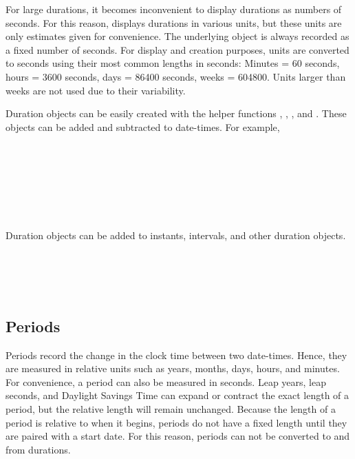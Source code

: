 \documentclass[article]{jss}
\begin{document}
For large durations, it becomes inconvenient to display durations as numbers of seconds. For this reason,  displays durations in various units, but these units are only estimates given for convenience. The underlying object is always recorded as a fixed number of seconds. For display and creation purposes, units are converted to seconds using their most common lengths in seconds: Minutes = 60 seconds, hours = 3600 seconds, days = 86400 seconds, weeks = 604800. Units larger than weeks are not used due to their variability.

Duration objects can be easily created with the helper functions 
, , , and  . These objects can be added and subtracted to date-times. For example,\\

\\
\\

\\
\\

\\
\\
\\

Duration objects can be added to instants, intervals, and other duration objects. \\

\\
\\
\\
\\

\subsection{Periods}
\label{sec:periods}

Periods record the change in the clock time between two date-times. Hence, they are measured in relative units such as years, months, days, hours, and minutes.  For convenience, a period can also be measured in seconds. Leap years, leap seconds, and Daylight Savings Time can expand or contract the exact length of a period, but the relative length will remain unchanged. Because the length of a period is relative to when it begins, periods do not have a fixed length until they are paired with a start date. For this reason, periods can not be converted to and from durations.
\end{document}
